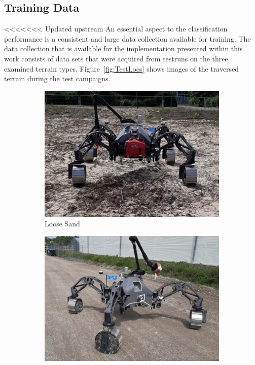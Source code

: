 \documentclass{article}
\begin{document}
\subsection{Training Data}

<<<<<<< Updated upstream
An essential aspect to the classification performance is a consistent and large data collection available for training. The data collection that is available for the implementation presented within this work consists of data sets that were acquired from testruns on the three examined terrain types. Figure~\ref{fig:TestLocs} shows images of the traversed terrain during the test campaigns.

\begin{figure}[!htb]
    \begin{subfigure}[t]{0.3\textwidth}
        \includegraphics[width=\textwidth]{../figures/unprepsand.png}
        \caption{Loose Sand}
    \end{subfigure}
    \qquad
    \begin{subfigure}[t]{0.3\textwidth}
        \includegraphics[width=\textwidth]{../figures/compact.png}

\end{subfigure}
\end{figure}
\end{document}
